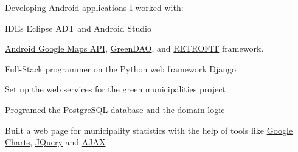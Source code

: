 \documentclass[]{joaosoares-resume}
\begin{document}
\begin{minipage}[t]{0.64\textwidth}
{\justifying Developing Android applications I worked with:\par} 
\begin{tightemize}
\item IDEs Eclipse ADT and Android Studio 
\item \href{https://developers.google.com/maps/documentation/android-api}{Android Google Maps API}, \href{http://greenrobot.org/greendao}{GreenDAO}, and \href{https://square.github.io/retrofit}{RETROFIT} framework.
\end{tightemize}

\sectionsep


\begin{tightemize}
\item Full-Stack programmer on the Python web framework Django
\item  Set up the web services for the green municipalities project
\item Programed the PostgreSQL database and the domain logic
\item Built a web page for municipality statistics with the help of tools like \href{https://developers.google.com/chart}{Google Charts}, \href{http://plugins.jquery.com}{JQuery} and  \href{https://api.jquery.com/category/ajax}{AJAX}
\end{tightemize}

\sectionsep

\end{minipage} 
\end{document}
